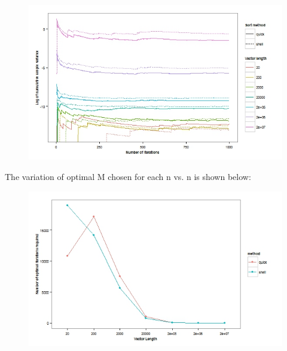 \documentclass[12pt]{article}
\begin{document}
\begin{enumerate}[label=(\alph*)]
\begin{figure}[H]
\begin{centering}
\includegraphics[scale=1.5]{Fig2.jpeg}
\caption{}
\end{centering}
\end{figure}

\clearpage
The variation of optimal M chosen for each n vs. n is shown below: 

\begin{figure}[H]
\begin{centering}
\includegraphics[scale=1.5]{Fig3.jpeg}
\caption{}
\end{centering}
\end{figure}



\end{enumerate}
\end{document}
